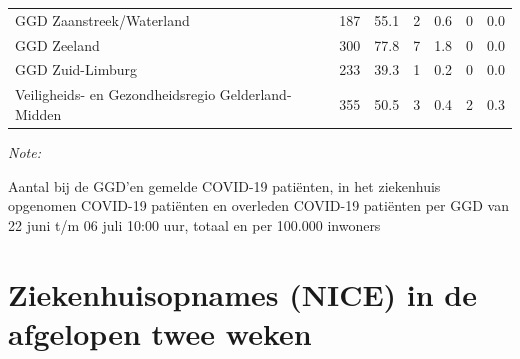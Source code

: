 \documentclass[
  english,
  man,floatsintext]{apa6}
\begin{document}
\begin{table}
\begin{threeparttable}
\begin{tabular}{lrrrrrr}
GGD Zaanstreek/Waterland & 187 & 55.1 & 2 & 0.6 & 0 & 0.0\\
GGD Zeeland & 300 & 77.8 & 7 & 1.8 & 0 & 0.0\\
GGD Zuid-Limburg & 233 & 39.3 & 1 & 0.2 & 0 & 0.0\\
Veiligheids- en Gezondheidsregio Gelderland-Midden & 355 & 50.5 & 3 & 0.4 & 2 & 0.3\\
\bottomrule
\end{tabular}
\begin{tablenotes}
\item \textit{Note: } 
\item Aantal bij de GGD’en gemelde COVID-19 patiënten, in het ziekenhuis opgenomen COVID-19 patiënten en overleden COVID-19 patiënten per GGD van 22 juni t/m 06 juli 10:00 uur, totaal en per 100.000 inwoners
\end{tablenotes}
\end{threeparttable}
\endgroup{}
\end{table}

\newpage

\hypertarget{ziekenhuisopnames-nice-in-de-afgelopen-twee-weken}{%
\section{Ziekenhuisopnames (NICE) in de afgelopen twee weken}\label{ziekenhuisopnames-nice-in-de-afgelopen-twee-weken}}
\end{document}
